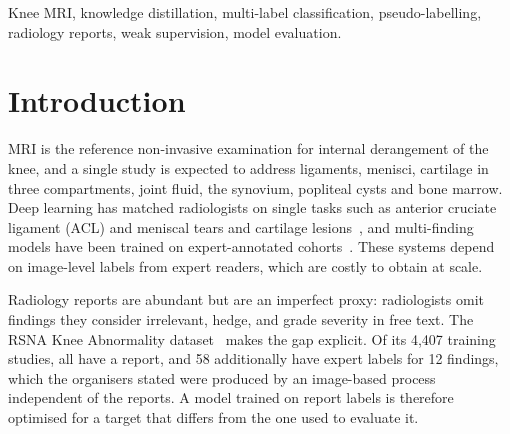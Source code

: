\documentclass{ieeeaccess}
\begin{document}
\begin{keywords}
Knee MRI, knowledge distillation, multi-label classification, pseudo-labelling, radiology reports, weak supervision,
model evaluation.
\end{keywords}

\titlepgskip=-21pt

\maketitle

\section{Introduction}
\label{sec:intro}

 MRI is the reference non-invasive examination for internal derangement of the knee, and a single study
is expected to address ligaments, menisci, cartilage in three compartments, joint fluid, the synovium, popliteal cysts and
bone marrow. Deep learning has matched radiologists on single tasks such as anterior cruciate ligament (ACL) and meniscal
tears and cartilage lesions~\cite{bien2018mrnet,liu2018cartilage,pedoia2019meniscus,namiri2020acl,fritz2020meniscus},
and multi-finding models have been trained on expert-annotated cohorts~\cite{astuto2021knee,qiu2024coplane}. These
systems depend on image-level labels from expert readers, which are costly to obtain at scale.

Radiology reports are abundant but are an imperfect proxy: radiologists omit findings they consider irrelevant, hedge,
and grade severity in free text. The RSNA Knee Abnormality dataset~\cite{rsna2026knee} makes the gap explicit. Of its
4,407 training studies, all have a report, and 58 additionally have expert labels for 12 findings, which the organisers
stated were produced by an image-based process independent of the reports. A model trained on report labels is
therefore optimised for a target that differs from the one used to evaluate it.
\end{document}

